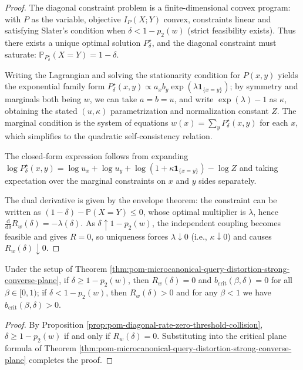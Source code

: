 \begin{proof}
The diagonal constraint problem is a finite-dimensional convex program: with \(P\) as the variable, objective \(I_P(X;Y)\) convex, constraints linear and satisfying Slater's condition when \(\delta<1-p_2(w)\) (strict feasibility exists).
Thus there exists a unique optimal solution \(P^\star_\delta\), and the diagonal constraint must saturate: \(\mathbb{P}_{P^\star_\delta}(X=Y)=1-\delta\).
\par
Writing the Lagrangian and solving the stationarity condition for \(P(x,y)\) yields the exponential family form
\(
P^\star_\delta(x,y)\propto a_x b_y\exp(\lambda\mathbf 1_{\{x=y\}})
\);
by symmetry and marginals both being \(w\), we can take \(a=b=u\), and write \(\exp(\lambda)-1\) as \(\kappa\), obtaining the stated \((u,\kappa)\) parametrization and normalization constant \(Z\).
The marginal condition is the system of equations \(w(x)=\sum_y P^\star_\delta(x,y)\) for each \(x\), which simplifies to the quadratic self-consistency relation.
\par
The closed-form expression follows from expanding
\(
\log P^\star_\delta(x,y)=\log u_x+\log u_y+\log(1+\kappa\mathbf 1_{\{x=y\}})-\log Z
\)
and taking expectation over the marginal constraints on \(x\) and \(y\) sides separately.
\par
The dual derivative is given by the envelope theorem: the constraint can be written as \((1-\delta)-\mathbb{P}(X=Y)\le 0\), whose optimal multiplier is \(\lambda\), hence \(\frac{\mathrm d}{\mathrm d\delta}R_w(\delta)=-\lambda(\delta)\).
As \(\delta\uparrow 1-p_2(w)\), the independent coupling becomes feasible and gives \(R=0\), so uniqueness forces \(\lambda\downarrow 0\) (i.e., \(\kappa\downarrow 0\)) and causes \(R_w(\delta)\downarrow 0\).
\end{proof}

\begin{corollary}\label{cor:pom-query-distortion-zero-bit-corridor}
Under the setup of Theorem \ref{thm:pom-microcanonical-query-distortion-strong-converse-plane},
if \(\delta\ge 1-p_2(w)\), then \(R_w(\delta)=0\) and \(b_{\mathrm{crit}}(\beta,\delta)=0\) for all \(\beta\in[0,1)\);
if \(\delta<1-p_2(w)\), then \(R_w(\delta)>0\) and for any \(\beta<1\) we have \(b_{\mathrm{crit}}(\beta,\delta)>0\).
\end{corollary}
\begin{proof}
By Proposition \ref{prop:pom-diagonal-rate-zero-threshold-collision}, \(\delta\ge 1-p_2(w)\) if and only if \(R_w(\delta)=0\).
Substituting into the critical plane formula of Theorem \ref{thm:pom-microcanonical-query-distortion-strong-converse-plane} completes the proof.
\end{proof}

